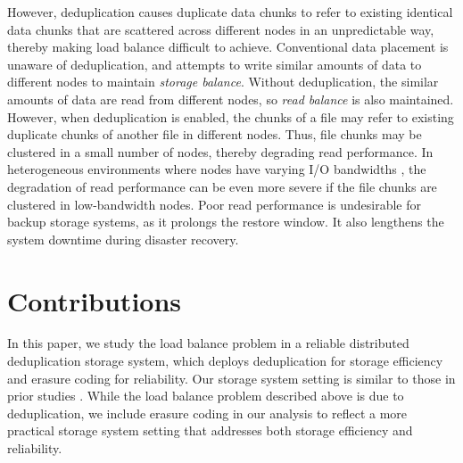 However, deduplication causes duplicate data chunks to refer to existing
identical data chunks that are scattered across different nodes in an
unpredictable way, thereby making load balance difficult to achieve.
Conventional data placement is unaware of deduplication, and attempts to
write similar amounts of data to different nodes to maintain {\em storage
balance}.  Without deduplication, the similar amounts of data are read from
different nodes, so {\em read balance} is also maintained.  However, when
deduplication is enabled, the chunks of a file may refer to existing duplicate
chunks of another file in different nodes.  Thus, file chunks may be clustered
in a small number of nodes, thereby degrading read performance.  
In heterogeneous
environments where nodes have varying I/O bandwidths \cite{chowdhury13}, the
degradation of read performance can be even more severe if the file chunks are
clustered in low-bandwidth nodes.  Poor read performance is undesirable for
backup storage systems, as it prolongs the restore window. It also lengthens 
the system downtime during disaster recovery.


\section{Contributions}

In this paper, we study the load balance problem in a reliable distributed
deduplication storage system, which deploys deduplication for storage
efficiency and erasure coding for reliability.  Our storage system setting is
similar to those in prior studies \cite{liu09,nam11,dubnicki09}.  While the
load balance problem described above is due to deduplication, we include
erasure coding in our analysis to reflect a more practical storage system
setting that addresses both storage efficiency and reliability. 

